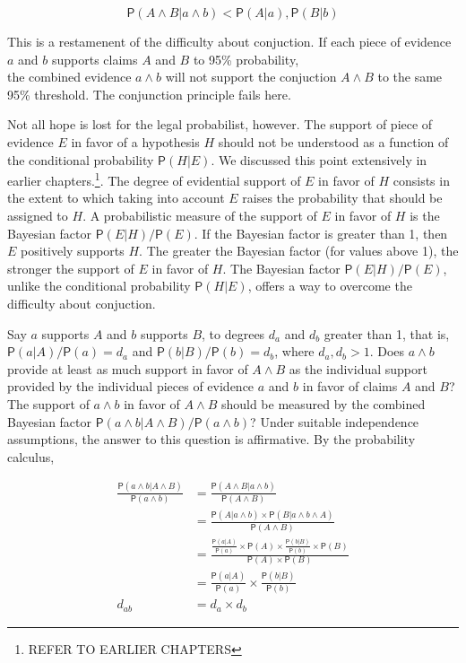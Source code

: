 \documentclass[10pt,dvipsnames,enabledeprecatedfontcommands]{scrartcl}
\newcommand{\et}{\wedge}
\newcommand{\pr}[1]{\mathsf{P}(#1)}
\begin{document}
\[\pr{A \wedge B | a \wedge b}< \pr{A | a}, \pr{B | b}  \]

This is a restamenent of the difficulty about conjuction. If each piece
of evidence \(a\) and \(b\) supports claims \(A\) and \(B\) to 95\%
probability,\\
the combined evidence \(a\et b\) will not support the conjuction
\(A\et B\) to the same 95\% threshold. The conjunction principle fails
here.

Not all hope is lost for the legal probabilist, however. The support of
piece of evidence \(E\) in favor of a hypothesis \(H\) should not be
understood as a function of the conditional probability \(\pr{H | E}\).
We discussed this point extensively in earlier
chapters.\footnote{REFER TO EARLIER CHAPTERS}. The degree of evidential
support of \(E\) in favor of \(H\) consists in the extent to which
taking into account \(E\) raises the probability that should be assigned
to \(H\). A probabilistic measure of the support of \(E\) in favor of
\(H\) is the Bayesian factor \(\pr{E | H}/\pr{E}\). If the Bayesian
factor is greater than 1, then \(E\) positively supports \(H\). The
greater the Bayesian factor (for values above 1), the stronger the
support of \(E\) in favor of \(H\). The Bayesian factor
\(\pr{E | H}/\pr{E}\), unlike the conditional probability
\(\pr{H | E}\), offers a way to overcome the difficulty about
conjuction.

Say \(a\) supports \(A\) and \(b\) supports \(B\), to degrees \(d_a\)
and \(d_b\) greater than 1, that is, \(\pr{a | A}/\pr{a}=d_a\) and
\(\pr{b | B}/\pr{b}=d_b\), where \(d_a, d_b >1\). Does \(a \wedge b\)
provide at least as much support in favor of \(A \wedge B\) as the
individual support provided by the individual pieces of evidence \(a\)
and \(b\) in favor of claims \(A\) and \(B\)? The support of \(a\et b\)
in favor of \(A\et B\) should be measured by the combined Bayesian
factor \(\pr{a \wedge b| A\wedge B}/\pr{a \wedge b}\)? Under suitable
independence assumptions, the answer to this question is affirmative. By
the probability calculus,

\begin{align*}
\frac{\pr{a \wedge b| A\wedge B}}{\pr{a \wedge b}} & =  \frac{\pr{A \et B| a\wedge b}}{\pr{A \et B}}\\
& =  \frac{\pr{A |a \wedge b} \times \pr{B | a \wedge b \wedge A}}{\pr{A \et B}} \\ 
& =  \frac{\frac{\pr{a |A}}{\pr{a}} \times \pr{A} \times \frac{\pr{b |B}}{\pr{b}} \times \pr{B}}{\pr{A} \times \pr{ B}} \\
& =  \frac{\pr{a |A}}{\pr{a}} \times \frac{\pr{b |B}}{\pr{b}} \\
d_{ab}& =  d_{a}\times d_{b} 
 \end{align*}
\end{document}
